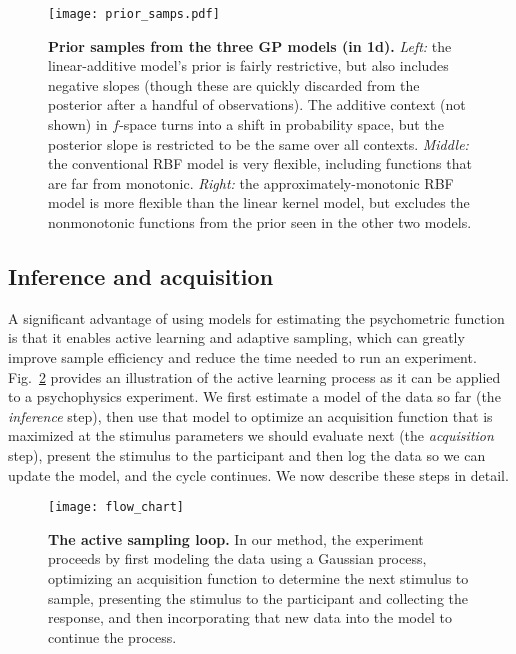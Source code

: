 \documentclass[../main.tex]{subfiles}
\begin{document}
\begin{figure}[htb]
    \centering
    \texttt{[image: prior\_samps.pdf]}
    \caption{\textbf{Prior samples from the three GP models (in 1d).} \emph{Left:} the linear-additive model's prior is fairly restrictive, but also includes negative slopes (though these are quickly discarded from the posterior after a handful of observations). The additive context (not shown) in $f$-space turns into a shift in probability space, but the posterior slope is restricted to be the same over all contexts. \emph{Middle:} the conventional RBF model is very flexible, including functions that are far from monotonic. \emph{Right:} the approximately-monotonic RBF model is more flexible than the linear kernel model, but excludes the nonmonotonic functions from the prior seen in the other two models. }
    \label{fig:prior_samps_fig}
\end{figure}

\subsection{Inference and acquisition}

A significant advantage of using models for estimating the psychometric function is that it enables active learning and adaptive sampling, which can greatly improve sample efficiency and reduce the time needed to run an experiment. Fig.~\ref{fig:flow_chart_fig} provides an illustration of the active learning process as it can be applied to a psychophysics experiment. We first estimate a model of the data so far (the \emph{inference} step), then use that model to optimize an acquisition function that is maximized at the stimulus parameters we should evaluate next (the \emph{acquisition} step), present the stimulus to the participant and then log the data so we can update the model, and the cycle continues. We now describe these steps in detail.

\begin{figure}[htb]
    \centering
    \texttt{[image: flow\_chart]}
    \caption{\textbf{The active sampling loop.} In our method, the experiment proceeds by first modeling the data using a Gaussian process, optimizing an acquisition function to determine the next stimulus to sample, presenting the stimulus to the participant and collecting the response, and then incorporating that new data into the model to continue the process.}
    \label{fig:flow_chart_fig}
\end{figure}
\end{document}

